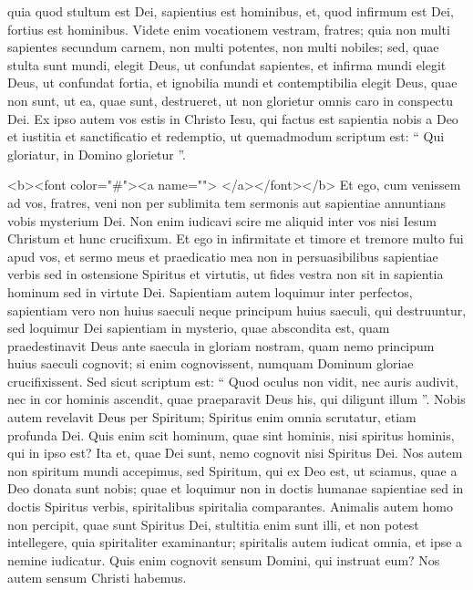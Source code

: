 \begin{biblechapter}
\verse quia quod stultum est Dei, sapientius est hominibus, et, quod infirmum est Dei, fortius est hominibus.
 \verse Videte enim vocationem vestram, fratres; quia non multi sapientes secundum carnem, non multi potentes, non multi nobiles; 
\verse sed, quae stulta sunt mundi, elegit Deus, ut confundat sapientes, et infirma mundi elegit Deus, ut confundat fortia, 
\verse et ignobilia mundi et contemptibilia elegit Deus, quae non sunt, ut ea, quae sunt, destrueret, 
\verse ut non glorietur omnis caro in conspectu Dei. 
\verse Ex ipso autem vos estis in Christo Iesu, qui factus est sapientia nobis a Deo et iustitia et sanctificatio et redemptio, 
\verse ut quemadmodum scriptum est:
“ Qui gloriatur, in Domino glorietur ”.  
\begin{biblechapter}
<b><font color="#\verse"><a name="\verse"> \verse</a></font></b> 
\verse Et ego, cum venissem ad vos, fratres, veni non per sublimita tem sermonis aut sapientiae annuntians vobis mysterium Dei. 
\verse Non enim iudicavi scire me aliquid inter vos nisi Iesum Christum et hunc crucifixum. 
\verse Et ego in infirmitate et timore et tremore multo fui apud vos, 
\verse et sermo meus et praedicatio mea non in persuasibilibus sapientiae verbis sed in ostensione Spiritus et virtutis, 
 \verse ut fides vestra non sit in sapientia hominum sed in virtute Dei.
 \verse Sapientiam autem loquimur inter perfectos, sapientiam vero non huius saeculi neque principum huius saeculi, qui destruuntur, 
\verse sed loquimur Dei sapientiam in mysterio, quae abscondita est, quam praedestinavit Deus ante saecula in gloriam nostram, 
\verse quam nemo principum huius saeculi cognovit; si enim cognovissent, numquam Dominum gloriae crucifixissent. 
\verse Sed sicut scriptum est: “ Quod oculus non vidit, nec auris audivit, nec in cor hominis ascendit, quae praeparavit Deus his, qui diligunt illum ”.
 \verse Nobis autem revelavit Deus per Spiritum; Spiritus enim omnia scrutatur, etiam profunda Dei. 
\verse Quis enim scit hominum, quae sint hominis, nisi spiritus hominis, qui in ipso est? Ita et, quae Dei sunt, nemo cognovit nisi Spiritus Dei. 
\verse Nos autem non spiritum mundi accepimus, sed Spiritum, qui ex Deo est, ut sciamus, quae a Deo donata sunt nobis; 
\verse quae et loquimur non in doctis humanae sapientiae sed in doctis Spiritus verbis, spiritalibus spiritalia comparantes. 
\verse Animalis autem homo non percipit, quae sunt Spiritus Dei, stultitia enim sunt illi, et non potest intellegere, quia spiritaliter examinantur; 
\verse spiritalis autem iudicat omnia, et ipse a nemine iudicatur.
 \verse Quis enim cognovit sensum Domini,
 qui instruat eum?
 Nos autem sensum Christi habemus.
 

\end{biblechapter}
\end{biblechapter}

